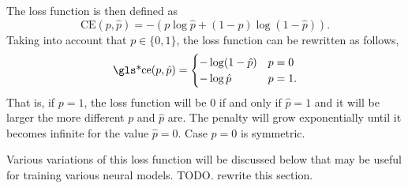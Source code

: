 The loss function is then defined as
\begin{equation}
  \text{CE}(p, \hat{p}) = -(p\log\hat{p} + (1 - p)\log(1 - \hat{p})).
\end{equation}
Taking into account that \(p \in \{0, 1\}\), the loss function can be rewritten
as follows,
\begin{equation}
  \text{\gls*{ce}}(p, \hat{p}) =
  \begin{cases}
    -\log(1 - \hat{p}) & p = 0 \\
    -\log\hat{p} & p = 1.
  \end{cases}
\end{equation}
That is, if \(p = 1\), the loss function will be \(0\) if and only if
\(\hat{p} = 1\) and it will be larger the more different \(p\) and \(\hat{p}\)
are. The penalty will grow exponentially until it becomes infinite for the
value \(\hat{p} = 0\). Case \(p = 0\) is symmetric.

Various variations of this loss function will be discussed below that may be
useful for training various neural models. TODO. rewrite this section.


